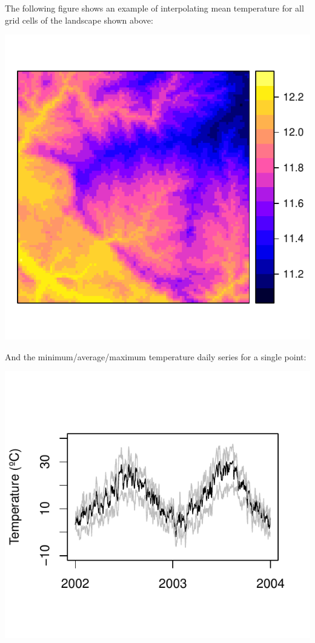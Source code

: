 \documentclass[11pt,a4paper]{article}
\begin{document}
The following figure shows an example of interpolating mean temperature for all grid cells of the landscape shown above:
\begin{center}
\includegraphics{Meteorology-011}
\end{center}
And the minimum/average/maximum temperature daily series for a single point:
\begin{center}
\includegraphics{Meteorology-012}
\end{center}
\end{document}
